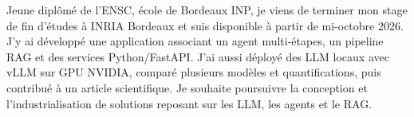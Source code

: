 
\begin{cvparagraph}
Jeune diplômé de l’ENSC, école de Bordeaux INP, je viens de terminer mon stage de fin d’études à INRIA Bordeaux et suis disponible à partir de mi-octobre 2026. J’y ai développé une application associant un agent multi-étapes, un pipeline RAG et des services Python/FastAPI. J’ai aussi déployé des LLM locaux avec vLLM sur GPU NVIDIA, comparé plusieurs modèles et quantifications, puis contribué à un article scientifique. Je souhaite poursuivre la conception et l’industrialisation de solutions reposant sur les LLM, les agents et le RAG.
\end{cvparagraph}
